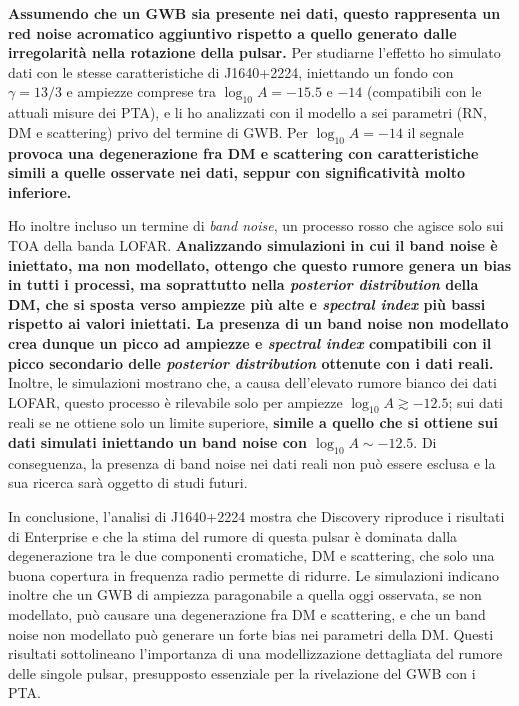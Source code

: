 \documentclass[12pt]{report}
\newcommand{\irene}[1]{{\color{blue}\bfseries #1}}
\begin{document}
\irene{Assumendo che un GWB sia presente nei dati, questo rappresenta un red noise
acromatico aggiuntivo rispetto a quello generato dalle irregolarità nella
rotazione della pulsar.} Per studiarne l'effetto ho simulato dati con le stesse
caratteristiche di J1640+2224, iniettando un fondo con $\gamma = 13/3$ e ampiezze
comprese tra $\log_{10}A = -15.5$ e $-14$ (compatibili con le attuali misure dei
PTA), e li ho analizzati con il modello a sei parametri (RN, DM e scattering)
privo del termine di GWB. Per $\log_{10}A = -14$ il segnale \irene{provoca una
degenerazione fra DM e scattering con caratteristiche simili a quelle osservate
nei dati, seppur con significatività molto inferiore.} \par

Ho inoltre incluso un termine di \textit{band noise}, un processo rosso che agisce
solo sui TOA della banda LOFAR. \irene{Analizzando simulazioni in cui il band noise è
iniettato, ma non modellato, ottengo che questo rumore genera un bias in tutti i
processi, ma soprattutto nella \textit{posterior distribution} della DM, che si
sposta verso ampiezze più alte e \textit{spectral index} più bassi rispetto ai
valori iniettati. La presenza di un band noise non modellato crea dunque un picco
ad ampiezze e \textit{spectral index} compatibili con il picco secondario delle
\textit{posterior distribution} ottenute con i dati reali.} Inoltre, le simulazioni
mostrano che, a causa dell'elevato rumore bianco dei dati LOFAR, questo processo è
rilevabile solo per ampiezze $\log_{10}A \gtrsim -12.5$; sui dati reali se ne
ottiene solo un limite superiore, \irene{simile a quello che si ottiene sui dati simulati
iniettando un band noise con $\log_{10}A \sim -12.5$}. Di conseguenza, la presenza
di band noise nei dati reali non può essere esclusa e la sua ricerca sarà oggetto
di studi futuri. \par

In conclusione, l'analisi di J1640+2224 mostra che Discovery riproduce i
risultati di Enterprise e che la stima del rumore di questa pulsar è dominata
dalla degenerazione tra le due componenti cromatiche, DM e scattering, che solo
una buona copertura in frequenza radio permette di ridurre. Le simulazioni
indicano inoltre che un GWB di ampiezza paragonabile a quella oggi osservata, se
non modellato, può causare una degenerazione fra DM e scattering, e che un band
noise non modellato può generare un forte bias nei parametri della DM. Questi
risultati sottolineano l'importanza di una modellizzazione dettagliata del rumore
delle singole pulsar, presupposto essenziale per la rivelazione del GWB con i PTA.
\par
\end{document}
